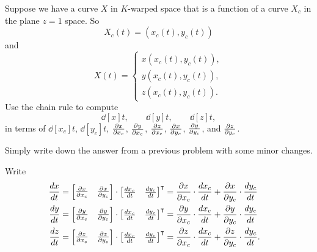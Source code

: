 \documentclass{ximera}
\begin{document}
\begin{problem}
Suppose we have a curve $X$ in $K$-warped space that is a function of
a curve $X_c$ in the plane $z=1$ space. So
\[
X_c(t) = \left( x_c(t),y_c(t)\right)
\]
and
\[
X(t) = 
\begin{cases}
  x(x_c(t),y_c(t)),\\
  y(x_c(t),y_c(t)),\\
  z(x_c(t),y_c(t)).
\end{cases}
\]
Use the chain rule to compute
\[
\dd[x]{t}, \qquad \dd[y]{t}, \qquad \dd[z]{t},
\]
in terms of $\dd[x_c]{t}$, $\dd[y_c]{t}$, $\pp[x]{x_c}$,
$\pp[y]{x_c}$, $\pp[z]{x_c}$, $\pp[x]{y_c}$, $\pp[y]{y_c}$,
and $\pp[z]{y_c}$.
  \begin{hint}
  Simply write down the answer from a previous problem with some minor
  changes.
  \end{hint}
  \begin{freeResponse}
  Write
  \begin{align*}
    \dd[x]{t} &= \begin{bmatrix}\pp[x]{x_c} & \pp[x]{y_c}\end{bmatrix}\cdot\begin{bmatrix}\dd[x_c]{t} & \dd[y_c]{t}\end{bmatrix}^\transpose = \pp[x]{x_c}\cdot\dd[x_c]{t}+\pp[x]{y_c}\cdot\dd[y_c]{t} &  \\
    \dd[y]{t} &= \begin{bmatrix}\pp[y]{x_c} & \pp[y]{y_c}\end{bmatrix}\cdot\begin{bmatrix}\dd[x_c]{t} & \dd[y_c]{t}\end{bmatrix}^\transpose = \pp[y]{x_c}\cdot\dd[x_c]{t}+\pp[y]{y_c}\cdot\dd[y_c]{t} &  \\
    \dd[z]{t} &= \begin{bmatrix}\pp[z]{x_c} & \pp[z]{y_c}\end{bmatrix}\cdot\begin{bmatrix}\dd[x_c]{t} & \dd[y_c]{t}\end{bmatrix}^\transpose = \pp[z]{x_c}\cdot\dd[x_c]{t}+\pp[z]{y_c}\cdot\dd[y_c]{t}.  
  \end{align*}
\end{freeResponse}
\end{problem}
\end{document}
